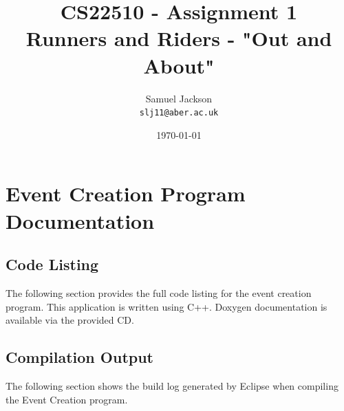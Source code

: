 \documentclass{article}
\begin{document}
\title{CS22510 - Assignment 1 \\ Runners and Riders - "Out and About"}
\author{Samuel Jackson \\ \texttt{slj11@aber.ac.uk}}
\date{\today}
\maketitle

\section{Event Creation Program Documentation}

\subsection{Code Listing}
The following section provides the full code listing for the event creation program. This application is written using C++. Doxygen documentation is available via the provided CD.




















\subsection{Compilation Output}
The following section shows the build log generated by Eclipse when compiling the Event Creation program.
\end{document}
